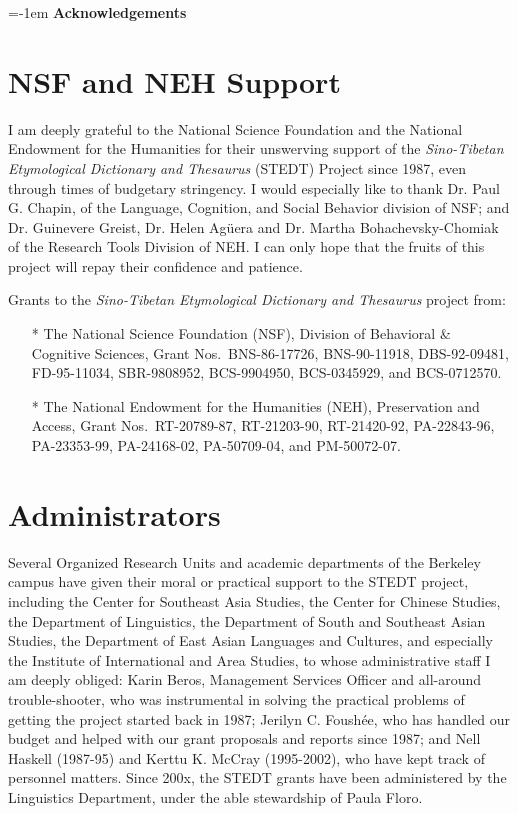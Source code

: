 {\large \parindent=-1em \textbf{Acknowledgements}}
\vspace{0.25em}

\section{NSF and NEH Support}

I am deeply grateful to the National Science Foundation and the National Endowment for the Humanities for their unswerving support of the {\it Sino-Tibetan Etymological Dictionary and Thesaurus} (STEDT) Project since 1987, even through times of budgetary stringency. I would especially like to thank Dr. Paul G. Chapin, of the Language, Cognition, and Social Behavior division of NSF; and Dr. Guinevere Greist, Dr. Helen Ag\"uera and Dr. Martha Bohachevsky-Chomiak of the Research Tools Division of NEH. I can only hope that the fruits of this project will repay their confidence and patience.

Grants to the \textit{Sino-Tibetan Etymological Dictionary and Thesaurus} project from:

\begin{itemize}
\item[*] The National Science Foundation (NSF), Division of
  Behavioral \& Cognitive Sciences, Grant Nos.\ BNS-86-17726,
  BNS-90-11918, DBS-92-09481, FD-95-11034, SBR-9808952,
  BCS-9904950, BCS-0345929, and BCS-0712570.
\item[*] The National Endowment for the Humanities (NEH),
  Preservation and Access, Grant Nos.\ RT-20789-87, RT-21203-90,
  RT-21420-92, PA-22843-96, PA-23353-99, PA-24168-02,
  PA-50709-04, and PM-50072-07.
\end{itemize}

\section{Administrators}

Several Organized Research Units and academic departments of the Berkeley campus have given their moral or practical support to the STEDT project, including the Center for Southeast Asia Studies, the Center for Chinese Studies, the Department of Linguistics, the Department of South and Southeast Asian Studies, the Department of East Asian Languages and Cultures, and especially the Institute of International and Area Studies, to whose administrative staff I am deeply obliged: Karin Beros, Management Services Officer and all-around trouble-shooter, who was instrumental in solving the practical problems of getting the project started back in 1987; Jerilyn C. Foush\'ee, who has handled our budget and helped with our grant proposals and reports since 1987; and Nell Haskell (1987-95) and Kerttu K. McCray (1995-2002), who have kept track of personnel matters.  Since 200x, the STEDT grants have been administered by the Linguistics Department, under the able stewardship of Paula Floro.

